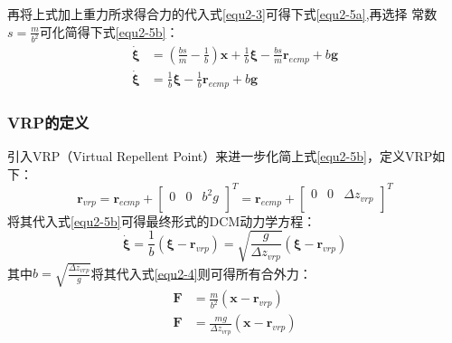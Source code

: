             再将上式加上重力所求得合力的代入式\eqref{equ2-3}可得下式\eqref{equ2-5a},再选择
            常数$s=\frac{m}{b^2}$可化简得下式\eqref{equ2-5b}：
            \begin{subequations}
                \begin{align}
                    \boldsymbol{\dot{\xi}} &= \left( \frac{bs}{m}-\frac{1}{b} \right) \boldsymbol{x}+\frac{1}{b}\boldsymbol{\xi }-\frac{bs}{m}\boldsymbol{r}_{ecmp}+b\boldsymbol{g}
                    \label{equ2-5a}\\
                    \boldsymbol{\dot{\xi}} &= \frac{1}{b}\boldsymbol{\xi }-\frac{1}{b}\boldsymbol{r}_{ecmp}+b\boldsymbol{g}
                    \label{equ2-5b}
                \end{align}
            \end{subequations}
        \subsubsection{VRP的定义}
            引入VRP（Virtual Repellent Point）来进一步化简上式\eqref{equ2-5b}，定义VRP如下：
            \begin{equation}
                \boldsymbol{r}_{vrp}=\boldsymbol{r}_{ecmp}+\left[ \begin{matrix}
                    0&		0&		b^2g\\
                \end{matrix} \right] ^T=\boldsymbol{r}_{ecmp}+\left[ \begin{matrix}
                    0&		0&		\varDelta z_{vrp}\\
                \end{matrix} \right] ^T
                \label{equ2-6}
            \end{equation}
            将其代入式\eqref{equ2-5b}可得最终形式的DCM动力学方程：
            \begin{equation}
                \boldsymbol{\dot{\xi}}=\frac{1}{b}\left( \boldsymbol{\xi }-\boldsymbol{r}_{vrp} \right) =\sqrt{\frac{g}{\varDelta z_{vrp}}}\left( \boldsymbol{\xi }-\boldsymbol{r}_{vrp} \right)
                \label{equ2-7}
            \end{equation}
            其中$b=\sqrt{\frac{\varDelta z_{vrp}}{g}}$将其代入式\eqref{equ2-4}则可得所有合外力：
            \begin{subequations}
                \begin{align}
                    \boldsymbol{F}&=\frac{m}{b^2}\left( \boldsymbol{x}-\boldsymbol{r}_{vrp} \right) 
                    \label{equ2-8a}\\
                    \boldsymbol{F}&=\frac{mg}{\varDelta z_{vrp}}\left( \boldsymbol{x}-\boldsymbol{r}_{vrp} \right) 
                    \label{equ2-8b}
                \end{align}               
            \end{subequations}
